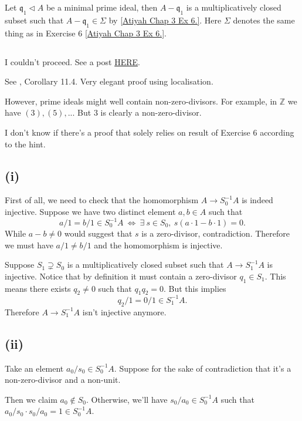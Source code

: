 Let $\mathfrak q_1\triangleleft A$ be a minimal prime ideal, then $A-\mathfrak q_1$ is a multiplicatively closed subset such that $A-\mathfrak q_1\in\Sigma$ by \ref{Atiyah Chap 3 Ex 6.}.
Here $\Sigma$ denotes the same thing as in Exercise 6 \ref{Atiyah Chap 3 Ex 6.}.

\subsection{}

I couldn't proceed. See a post \href{https://mathoverflow.net/questions/67382/minimal-primes-and-zero-divisors}{HERE}.

See \cite{altman}, Corollary 11.4. Very elegant proof using localisation. 

However, prime ideals might well contain non-zero-divisors. For example, in $\mathbb Z$ we have $(3), (5),...$ But $3$ is clearly a non-zero-divisor.

I don't know if there's a proof that solely relies on result of Exercise 6 according to the hint.


\subsection{(i)}

First of all, we need to check that the homomorphism $A\to S_0^{-1}A$ is indeed injective. Suppose we have two distinct element $a,b\in A$ such that \[a/1=b/1\in S_0^{-1}A ~\Leftrightarrow~ \exists~s\in S_0,~ s(a\cdot 1-b\cdot 1)=0.\] While $a-b\neq 0$ would suggest that $s$ is a zero-divisor, contradiction. Therefore we must have $a/1\neq b/1$ and the homomorphism is injective. 

Suppose $S_1\supsetneq S_0$ is a multiplicatively closed subset such that $A\to S_1^{-1}A$ is injective. Notice that by definition it must contain a zero-divisor $q_1\in S_1$. This means there exists $q_2\neq 0$ such that $q_1q_2=0$. But this implies \[q_2/1=0/1\in S_1^{-1}A.\] Therefore $A\to S_1^{-1}A$ isn't injective anymore. 

\subsection{(ii)}

Take an element $a_0/s_0\in S_0^{-1}A$. Suppose for the sake of contradiction that it's a non-zero-divisor and a non-unit. 

Then we claim $a_0\notin S_0$. Otherwise, we'll have $s_0/a_0\in S_0^{-1}A$ such that $a_0/s_0\cdot s_0/a_0=1\in S_0^{-1}A$. 

